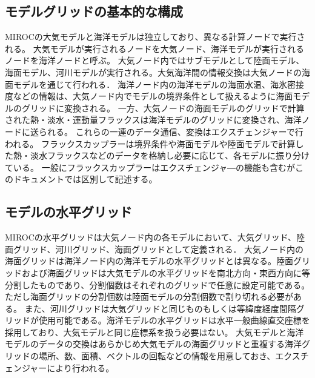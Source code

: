 \hypertarget{ux30e2ux30c7ux30ebux30b0ux30eaux30c3ux30c9ux306eux57faux672cux7684ux306aux69cbux6210}{%
\subsection{モデルグリッドの基本的な構成}\label{ux30e2ux30c7ux30ebux30b0ux30eaux30c3ux30c9ux306eux57faux672cux7684ux306aux69cbux6210}}

MIROCの大気モデルと海洋モデルは独立しており、異なる計算ノードで実行される。
大気モデルが実行されるノードを大気ノード、海洋モデルが実行されるノードを海洋ノードと呼ぶ。
大気ノード内ではサブモデルとして陸面モデル、海面モデル、河川モデルが実行される。大気海洋間の情報交換は大気ノードの海面モデルを通じて行われる．
海洋ノード内の海洋モデルの海面水温、海氷密接度などの情報は、大気ノード内でモデルの境界条件として扱えるように海面モデルのグリッドに変換される。
一方、大気ノードの海面モデルのグリッドで計算された熱・淡水・運動量フラックスは海洋モデルのグリッドに変換され、海洋ノードに送られる。
これらの一連のデータ通信、変換はエクスチェンジャーで行われる。
フラックスカップラーは境界条件や海面モデルや陸面モデルで計算した熱・淡水フラックスなどのデータを格納し必要に応じて、各モデルに振り分けている。
一般にフラックスカップラーはエクスチェンジャ―の機能も含むがこのドキュメントでは区別して記述する。

\hypertarget{ux30e2ux30c7ux30ebux306eux6c34ux5e73ux30b0ux30eaux30c3ux30c9}{%
\subsection{モデルの水平グリッド}\label{ux30e2ux30c7ux30ebux306eux6c34ux5e73ux30b0ux30eaux30c3ux30c9}}

MIROCの水平グリッドは大気ノード内の各モデルにおいて、大気グリッド、陸面グリッド、河川グリッド、海面グリッドとして定義される．
大気ノード内の海面グリッドは海洋ノード内の海洋モデルの水平グリッドとは異なる。陸面グリッドおよび海面グリッドは大気モデルの水平グリッドを南北方向・東西方向に等分割したものであり、分割個数はそれぞれのグリッドで任意に設定可能である。
ただし海面グリッドの分割個数は陸面モデルの分割個数で割り切れる必要がある。
また、河川グリッドは大気グリッドと同じものもしくは等緯度経度間隔グリッドが使用可能である。海洋モデルの水平グリッドは水平一般曲線直交座標を採用しており、大気モデルと同じ座標系を扱う必要はない。
大気モデルと海洋モデルのデータの交換はあらかじめ大気モデルの海面グリッドと重複する海洋グリッドの場所、数、面積、ベクトルの回転などの情報を用意しておき、エクスチェンジャーにより行われる。

